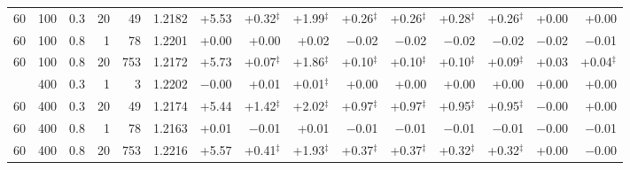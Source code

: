 \begin{tabular}{@{}rrrrr rrrrrrrrrr@{}}
60 & 100 & 0.3 & 20 & 49 & 1.2182 & +5.53 & +0.32$^{\ddagger}$ & +1.99$^{\ddagger}$ & +0.26$^{\ddagger}$ & +0.26$^{\ddagger}$ & +0.28$^{\ddagger}$ & +0.26$^{\ddagger}$ & +0.00 & +0.00 \\
60 & 100 & 0.8 & 1 & 78 & 1.2201 & +0.00 & +0.00 & +0.02 & $-$0.02 & $-$0.02 & $-$0.02 & $-$0.02 & $-$0.02 & $-$0.01 \\
60 & 100 & 0.8 & 20 & 753 & 1.2172 & +5.73 & +0.07$^{\ddagger}$ & +1.86$^{\ddagger}$ & +0.10$^{\ddagger}$ & +0.10$^{\ddagger}$ & +0.10$^{\ddagger}$ & +0.09$^{\ddagger}$ & +0.03 & +0.04$^{\ddagger}$ \\
\addlinespace[1pt]
60 & 400 & 0.3 & 1 & 3 & 1.2202 & $-$0.00 & +0.01 & +0.01$^{\ddagger}$ & +0.00 & +0.00 & +0.00 & +0.00 & +0.00 & +0.00 \\
60 & 400 & 0.3 & 20 & 49 & 1.2174 & +5.44 & +1.42$^{\ddagger}$ & +2.02$^{\ddagger}$ & +0.97$^{\ddagger}$ & +0.97$^{\ddagger}$ & +0.95$^{\ddagger}$ & +0.95$^{\ddagger}$ & $-$0.00 & +0.00 \\
60 & 400 & 0.8 & 1 & 78 & 1.2163 & +0.01 & $-$0.01 & +0.01 & $-$0.01 & $-$0.01 & $-$0.01 & $-$0.01 & $-$0.00 & $-$0.01 \\
60 & 400 & 0.8 & 20 & 753 & 1.2216 & +5.57 & +0.41$^{\ddagger}$ & +1.93$^{\ddagger}$ & +0.37$^{\ddagger}$ & +0.37$^{\ddagger}$ & +0.32$^{\ddagger}$ & +0.32$^{\ddagger}$ & +0.00 & $-$0.00 \\
\bottomrule
\end{tabular}